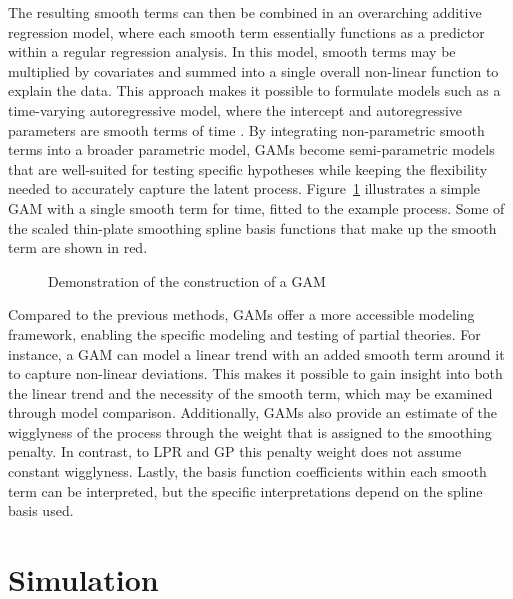 \documentclass[man, floatsintext]{apa7}
\begin{document}
The resulting smooth terms can then be combined in an overarching additive
regression model, where each smooth term essentially functions as a
predictor within a regular regression
analysis. In this model, smooth terms may be multiplied by covariates and
summed into a single overall non-linear function to explain the data. This
approach makes it possible to formulate models such as a time-varying
autoregressive model, where the intercept and autoregressive parameters are
smooth terms of time \parencite{bringmann_changing_2017,
  bringmann_modeling_2015}. By integrating non-parametric smooth terms into a
broader parametric model, GAMs become semi-parametric models that are
well-suited for testing specific hypotheses while keeping the flexibility
needed to accurately capture the latent process. Figure~\ref{fig:gam_dem}
illustrates a simple GAM with a single smooth term for time, fitted to the
example process. Some of the scaled thin-plate smoothing spline basis
functions that make up the smooth term are shown in red.

\begin{figure}[!ht]
  \caption{Demonstration of the construction of a GAM}
  \label{fig:gam_dem}
\end{figure}

Compared to the previous methods, GAMs offer a more accessible modeling
framework,
enabling the specific modeling and testing of partial theories. For instance, a
GAM can model a linear trend with an added smooth term around it to capture
non-linear deviations. This makes it possible to gain insight into both
the linear trend and the necessity of the smooth term, which may be examined
through model comparison.
Additionally, GAMs also provide an estimate of the wigglyness
of the process through the weight that is assigned to the smoothing penalty.
In contrast, to LPR and GP
this penalty weight does not assume constant wigglyness. Lastly, the
basis function coefficients within each smooth term can be interpreted,
but the specific interpretations depend on the spline basis used.

\section{Simulation}
\end{document}

